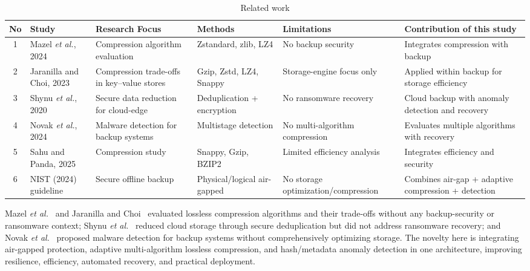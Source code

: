 \documentclass{iaesarticle}
\begin{document}
\begin{table}[htbp]
\centering
\fontsize{8pt}{10pt}\selectfont
\caption{Related work}
\label{tab:related_work}
\begin{tabularx}{\textwidth}{@{}c p{2.2cm} X X X X@{}}
\hline
\textbf{No} & \textbf{Study} & \textbf{Research Focus} & \textbf{Methods} & \textbf{Limitations} & \textbf{Contribution of this study} \\
\hline
1 & Mazel \textit{et al.}, 2024 & Compression algorithm evaluation & Zstandard, zlib, LZ4 & No backup security & Integrates compression with backup \\
2 & Jaranilla and Choi, 2023 & Compression trade-offs in key--value stores & Gzip, Zstd, LZ4, Snappy & Storage-engine focus only & Applied within backup for storage efficiency \\
3 & Shynu \textit{et al.}, 2020 & Secure data reduction for cloud-edge & Deduplication + encryption & No ransomware recovery & Cloud backup with anomaly detection and recovery \\
4 & Novak \textit{et al.}, 2024 & Malware detection for backup systems & Multistage detection & No multi-algorithm compression & Evaluates multiple algorithms with recovery \\
5 & Sahu and Panda, 2025 & Compression study & Snappy, Gzip, BZIP2 & Limited efficiency analysis & Integrates efficiency and security \\
6 & NIST (2024) guideline & Secure offline backup & Physical/logical air-gapped & No storage optimization/compression & Combines air-gap + adaptive compression + detection \\
\hline
\end{tabularx}
\end{table}

Mazel \textit{et al.}~\cite{36} and Jaranilla and Choi~\cite{37} evaluated lossless compression algorithms and their trade-offs without any backup-security or ransomware context; Shynu \textit{et al.}~\cite{38} reduced cloud storage through secure deduplication but did not address ransomware recovery; and Novak \textit{et al.}~\cite{29} proposed malware detection for backup systems without comprehensively optimizing storage. The novelty here is integrating air-gapped protection, adaptive multi-algorithm lossless compression, and hash/metadata anomaly detection in one architecture, improving resilience, efficiency, automated recovery, and practical deployment.
\end{document}
